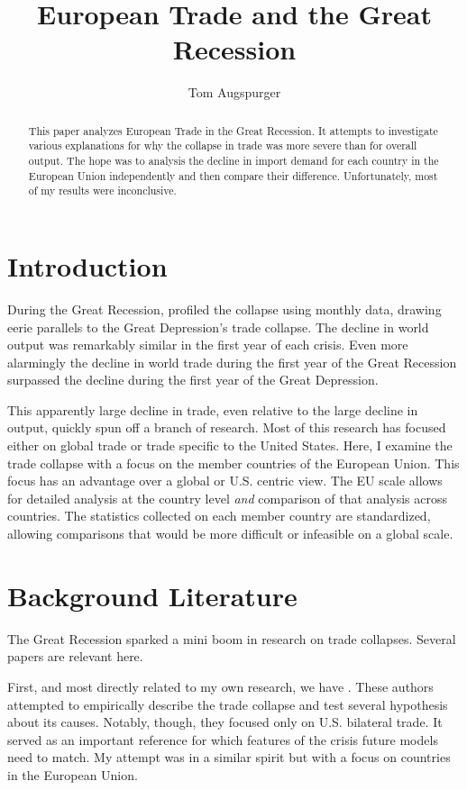 \documentclass[11pt]{article}
\title{European Trade and the Great Recession}
\author{Tom Augspurger}
\date{}
\begin{document}
\maketitle
\begin{abstract}
  This paper analyzes European Trade in the Great Recession.  It attempts to investigate various explanations for why the collapse in trade was more severe than for overall output.  The hope was to analysis the decline in import demand for each country in the European Union independently and then compare their difference.  Unfortunately, most of my results were inconclusive.
\end{abstract}
\section{Introduction}
\label{sec:introduction}

  During the Great Recession, \cite{eichengreen_orourke:2010} profiled the collapse using monthly data, drawing eerie parallels to the Great Depression's trade collapse.  The decline in world output was remarkably similar in the first year of each crisis.  Even more alarmingly the decline in world trade during the first year of the Great Recession surpassed the decline during the first year of the Great Depression.

  This apparently large decline in trade, even relative to the large decline in output, quickly spun off a branch of research.  Most of this research has focused either on global trade or trade specific to the United States.  Here, I examine the trade collapse with a focus on the member countries of the European Union.  This focus has an advantage over a global or U.S. centric view.  The EU scale allows for detailed analysis at the country level \emph{and} comparison of that analysis across countries. The statistics collected on each member country are standardized, allowing comparisons that would be more difficult or infeasible on a global scale.

\section{Background Literature}
\label{sec:background_literature}
  The Great Recession sparked a mini boom in research on trade collapses.  Several papers are relevant here. 

  First, and most directly related to my own research, we have \cite{llt:2010}.  These authors attempted to empirically describe the trade collapse and test several hypothesis about its causes.  Notably, though, they focused only on U.S. bilateral trade.  It served as an important reference for which features of the crisis future models need to match.  My attempt was in a similar spirit but with a focus on countries in the European Union.
\end{document}
